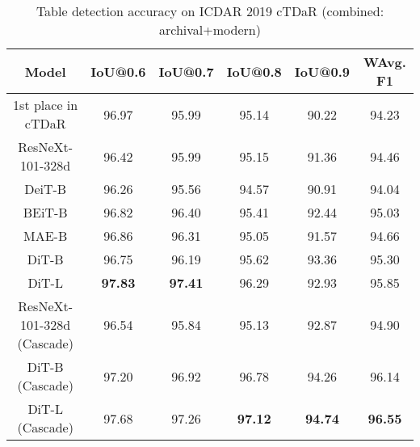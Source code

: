 \documentclass[sigconf]{acmart}
\begin{document}
\begin{table*}[t]
\begin{subtable}[ht]{1\textwidth}
    \centering
    \begin{tabular}{cccccc}
        \toprule

        \textbf{Model} & \textbf{IoU@0.6} & \textbf{IoU@0.7} & \textbf{IoU@0.8} & \textbf{IoU@0.9} & \textbf{WAvg. F1}\\
        \midrule
        1st place in cTDaR & 96.97 & 95.99 & 95.14 & 90.22 & 94.23 \\
        \midrule
        ResNeXt-101-328d & 96.42 &95.99 & 95.15 &91.36 & 94.46\\
        DeiT-B &96.26	&95.56	&94.57	&90.91	&94.04\\
        BEiT-B &96.82	&96.40	&95.41	&92.44	&95.03\\
        MAE-B &96.86	&96.31	&95.05	&91.57	&94.66\\
        \midrule
        DiT-B &96.75 &96.19 &95.62 &93.36 &95.30\\
        DiT-L & \bf 97.83 & \bf 97.41 &96.29 &92.93 &95.85\\
        \midrule
        ResNeXt-101-328d (Cascade) &96.54 &95.84 &95.13 &92.87 &94.90\\
        DiT-B (Cascade) &97.20 &96.92 &96.78 &94.26 &96.14\\
        DiT-L (Cascade)	&97.68	&97.26	& \bf 97.12	& \bf 94.74	& \bf 96.55 \\
        \bottomrule
    \end{tabular}
    \caption{Table detection accuracy on ICDAR 2019 cTDaR (combined: archival+modern)}
    \label{tab:table_combined}
\end{subtable}


\end{table*}
\end{document}
